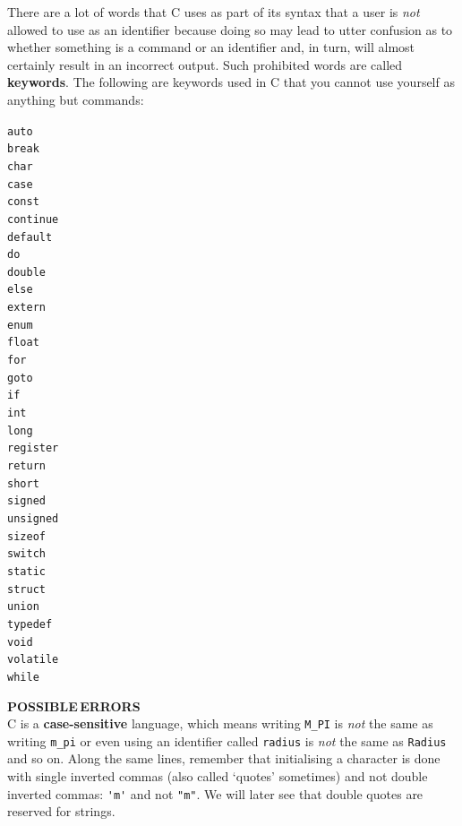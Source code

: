 \documentclass[11pt,oneside]{article}
\newcommand{\eb}[1]{\textbf{\scriptsize{\sffamily\addfontfeatures{LetterSpace=7} #1\\[.35em]}}}
\begin{document}
{{{{{{{There are a lot of words that C uses as part of its syntax that a user is \textit{not} allowed to use as an identifier because doing so may lead to utter confusion as to whether something is a command or an identifier and, in turn, will almost certainly result in an incorrect output. Such prohibited words are called \textbf{keywords}. The following are keywords used in C that you cannot use yourself as anything but commands:
\begin{multicols}{8}
\noindent\verb+auto+ \\
\verb+break+ \\
\verb+char+ \\
\verb+case+ \\
\verb+const+ \\
\verb+continue+ \\
\verb+default+ \\
\verb+do+ \\
\verb+double+ \\
\verb+else+ \\
\verb+extern+ \\
\verb+enum+ \\
\verb+float+ \\
\verb+for+ \\
\verb+goto+ \\
\verb+if+\\
\verb+int+\\
\verb+long+ \\
\verb+register+ \\
\verb+return+ \\
\verb+short+ \\
\verb+signed+ \\
\verb+unsigned+ \\
\verb+sizeof+ \\
\verb+switch+ \\
\verb+static+ \\
\verb+struct+ \\
\verb+union+ \\
\verb+typedef+ \\
\verb+void+ \\
\verb+volatile+ \\
\verb+while+
\end{multicols}
\vspace{.25cm}
\begin{errorbox}
\eb{POSSIBLE\;\,ERRORS }
C is a \textbf{case-sensitive} language, which means writing \verb+M_PI+ is \textit{not} the same as writing \verb+m_pi+ or even using an identifier called \verb+radius+ is \textit{not} the same as \verb+Radius+ and so on. Along the same lines, remember that initialising a character is done with single inverted commas (also called `quotes' sometimes) and not double inverted commas: \verb+'m'+ and not \verb+"m"+. We will later see that double quotes are reserved for strings.
\end{errorbox}

}}}}}}}
\end{document}
